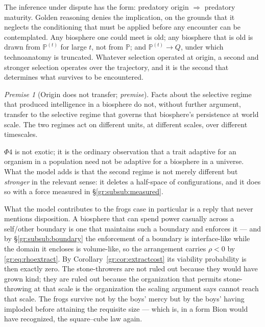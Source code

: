 \documentclass[11pt]{article}
\numberwithin{equation}{section}
\theoremstyle{plain}
\theoremstyle{definition}
\theoremstyle{remark}
\newcommand{\PP}{\mathbb{P}}
\newtheorem{premise}{Premise}
\begin{document}
The inference under dispute has the form: predatory origin
$\Rightarrow$ predatory maturity. Golden reasoning denies the
implication, on the grounds that it neglects the conditioning that must
be applied before any encounter can be contemplated. Any biosphere one could meet is old; any biosphere
that is old is drawn from $\PP^{(t)}$ for large $t$, not from $\PP$; and
$\PP^{(t)}\to Q$, under which technoanatomy is truncated. Whatever
selection operated at origin, a second and stronger selection operates
over the trajectory, and it is the second that determines what survives
to be encountered.

\setcounter{premise}{3} %
\begin{premise}[Origin does not transfer; \emph{premise}]
\label{gr:phi4}
Facts about the selective regime that produced intelligence in a
biosphere do not, without further argument, transfer to the selective
regime that governs that biosphere's persistence at world scale. The two
regimes act on different units, at different scales, over different
timescales.
\end{premise}

$\Phi4$ is not exotic; it is the ordinary observation that a trait
adaptive for an organism in a population need not be adaptive for a
biosphere in a universe. What the model adds is that the second regime
is not merely different but \emph{stronger} in the relevant sense: it
deletes a half-space of configurations, and it does so with a force
measured in \S\ref{gr:subsub:measured}.

What the model contributes to the frogs case in particular is a reply
that never mentions disposition. A biosphere that can spend power
casually across a self/other boundary is one that maintains such a
boundary and enforces it --- and by \S\ref{gr:subsub:boundary} the
enforcement of a boundary is interface-like while the domain it encloses
is volume-like, so the arrangement carries $\rho<0$ by
\eqref{gr:eq:rhoextract}. By Corollary~\ref{gr:cor:extractcost} its
viability probability is then exactly zero. The stone-throwers are not
ruled out because they would have grown kind; they are ruled out
because the organization that permits stone-throwing at that scale is
the organization the scaling argument says cannot reach that scale. The
frogs survive not by the boys' mercy but by the boys' having imploded
before attaining the requisite size --- which is, in a form Bion would
have recognized, the square--cube law again.
\end{document}
